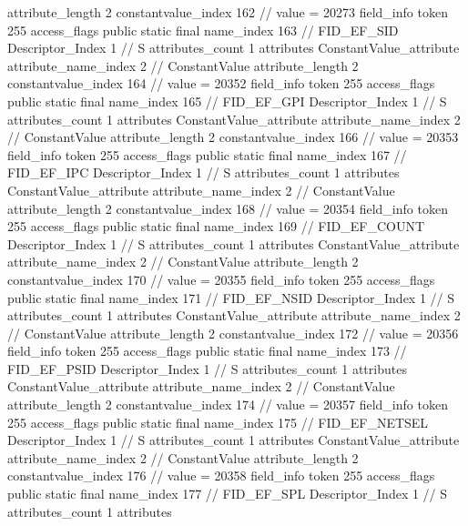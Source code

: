 {{{{{{{					attribute_length	2
					constantvalue_index	162		// value = 20273
				}
				}
			}
			field_info {
				token	255
				access_flags	public static final
				name_index	163		// FID_EF_SID
				Descriptor_Index	1		// S
				attributes_count	1
				attributes {
				ConstantValue_attribute {
					attribute_name_index	2		// ConstantValue
					attribute_length	2
					constantvalue_index	164		// value = 20352
				}
				}
			}
			field_info {
				token	255
				access_flags	public static final
				name_index	165		// FID_EF_GPI
				Descriptor_Index	1		// S
				attributes_count	1
				attributes {
				ConstantValue_attribute {
					attribute_name_index	2		// ConstantValue
					attribute_length	2
					constantvalue_index	166		// value = 20353
				}
				}
			}
			field_info {
				token	255
				access_flags	public static final
				name_index	167		// FID_EF_IPC
				Descriptor_Index	1		// S
				attributes_count	1
				attributes {
				ConstantValue_attribute {
					attribute_name_index	2		// ConstantValue
					attribute_length	2
					constantvalue_index	168		// value = 20354
				}
				}
			}
			field_info {
				token	255
				access_flags	public static final
				name_index	169		// FID_EF_COUNT
				Descriptor_Index	1		// S
				attributes_count	1
				attributes {
				ConstantValue_attribute {
					attribute_name_index	2		// ConstantValue
					attribute_length	2
					constantvalue_index	170		// value = 20355
				}
				}
			}
			field_info {
				token	255
				access_flags	public static final
				name_index	171		// FID_EF_NSID
				Descriptor_Index	1		// S
				attributes_count	1
				attributes {
				ConstantValue_attribute {
					attribute_name_index	2		// ConstantValue
					attribute_length	2
					constantvalue_index	172		// value = 20356
				}
				}
			}
			field_info {
				token	255
				access_flags	public static final
				name_index	173		// FID_EF_PSID
				Descriptor_Index	1		// S
				attributes_count	1
				attributes {
				ConstantValue_attribute {
					attribute_name_index	2		// ConstantValue
					attribute_length	2
					constantvalue_index	174		// value = 20357
				}
				}
			}
			field_info {
				token	255
				access_flags	public static final
				name_index	175		// FID_EF_NETSEL
				Descriptor_Index	1		// S
				attributes_count	1
				attributes {
				ConstantValue_attribute {
					attribute_name_index	2		// ConstantValue
					attribute_length	2
					constantvalue_index	176		// value = 20358
				}
				}
			}
			field_info {
				token	255
				access_flags	public static final
				name_index	177		// FID_EF_SPL
				Descriptor_Index	1		// S
				attributes_count	1
				attributes {
}}}}}}
